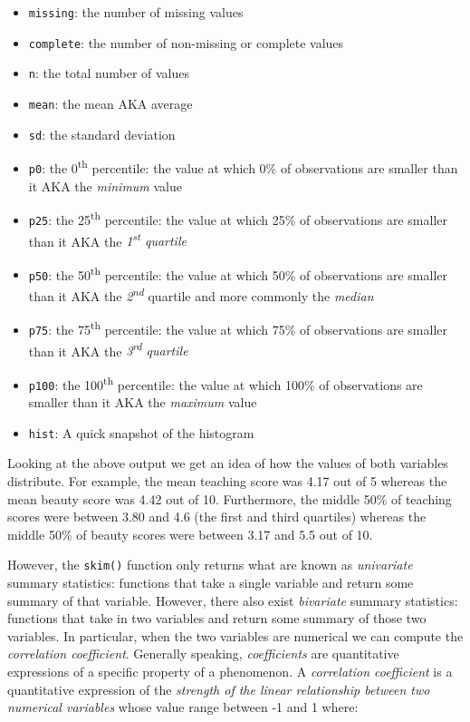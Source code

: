 \documentclass[12pt, krantz2,]{krantz}
\providecommand{\tightlist}{%
  \setlength{\itemsep}{0pt}\setlength{\parskip}{0pt}}
\begin{document}
\begin{itemize}
\tightlist
\item
  \texttt{missing}: the number of missing values
\item
  \texttt{complete}: the number of non-missing or complete values
\item
  \texttt{n}: the total number of values
\item
  \texttt{mean}: the mean AKA average
\item
  \texttt{sd}: the standard deviation
\item
  \texttt{p0}: the 0\textsuperscript{th} percentile: the value at which 0\% of observations are smaller than it AKA the \emph{minimum} value
\item
  \texttt{p25}: the 25\textsuperscript{th} percentile: the value at which 25\% of observations are smaller than it AKA the \emph{1\textsuperscript{st} quartile}
\item
  \texttt{p50}: the 50\textsuperscript{th} percentile: the value at which 50\% of observations are smaller than it AKA the \emph{2\textsuperscript{nd}} quartile and more commonly the \emph{median}
\item
  \texttt{p75}: the 75\textsuperscript{th} percentile: the value at which 75\% of observations are smaller than it AKA the \emph{3\textsuperscript{rd} quartile}
\item
  \texttt{p100}: the 100\textsuperscript{th} percentile: the value at which 100\% of observations are smaller than it AKA the \emph{maximum} value
\item
  \texttt{hist}: A quick snapshot of the histogram
\end{itemize}

Looking at the above output we get an idea of how the values of both variables distribute. For example, the mean teaching score was 4.17 out of 5 whereas the mean beauty score was 4.42 out of 10. Furthermore, the middle 50\% of teaching scores were between 3.80 and 4.6 (the first and third quartiles) whereas the middle 50\% of beauty scores were between 3.17 and 5.5 out of 10.

However, the \texttt{skim()} function only returns what are known as \emph{univariate} summary statistics: functions that take a single variable and return some summary of that variable. However, there also exist \emph{bivariate} summary statistics: functions that take in two variables and return some summary of those two variables. In particular, when the two variables are numerical we can compute the \emph{correlation coefficient}. Generally speaking, \emph{coefficients} are quantitative expressions of a specific property of a phenomenon. A \emph{correlation coefficient} is a quantitative expression of the \emph{strength of the linear relationship between two numerical variables} whose value range between -1 and 1 where:
\end{document}
